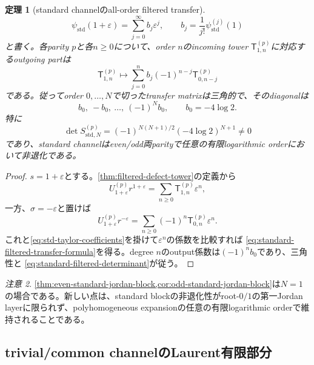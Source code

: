 \documentclass[11pt,a4paper]{ltjsarticle}
\newtheorem{theorem}{定理}[section]
\theoremstyle{definition}
\theoremstyle{remark}
\newtheorem{remark}[theorem]{注意}
\newcommand{\eps}{\varepsilon}
\begin{document}
\begin{theorem}[standard channelのall-order filtered transfer]
\label{thm:standard-filtered-transfer}
\begin{equation}\label{eq:std-taylor-coefficients}
 \psi_{\mathrm{std}}(1+\eps)
 =\sum_{j=0}^{\infty}b_j\eps^j,
 \qquad
 b_j=\frac1{j!}\psi_{\mathrm{std}}^{(j)}(1)
\end{equation}
と書く。各parity $p$と各$n\ge0$について、order $n$のincoming tower
$\mathsf T_{1,n}^{(p)}$に対応するoutgoing partは
\begin{equation}\label{eq:standard-filtered-transfer-formula}
 \boxed{
 \mathsf T_{1,n}^{(p)}\longmapsto
 \sum_{j=0}^{n}
 b_j(-1)^{n-j}\mathsf T_{0,n-j}^{(p)}
 }
\end{equation}
である。従ってorder $0,\ldots,N$で切ったtransfer matrixは三角的で、そのdiagonalは
\begin{equation}\label{eq:standard-filtered-diagonal}
 b_0,\ -b_0,\ \ldots,\ (-1)^Nb_0,
 \qquad b_0=-4\log2.
\end{equation}
特に
\begin{equation}\label{eq:standard-filtered-determinant}
 \boxed{
 \det S_{\mathrm{std},N}^{(p)}
 =(-1)^{N(N+1)/2}(-4\log2)^{N+1}\ne0
 }
\end{equation}
であり、standard channelはeven/odd両parityで任意の有限logarithmic orderにおいて非退化である。
\end{theorem}

\begin{proof}
$s=1+\eps$とする。\cref{thm:filtered-defect-tower}の定義から
\[
 U_{1+\eps}^{(p)}r^{1+\eps}
 =\sum_{n\ge0}\mathsf T_{1,n}^{(p)}\eps^n,
\]
一方、$\sigma=-\eps$と置けば
\[
 U_{1+\eps}^{(p)}r^{-\eps}
 =\sum_{n\ge0}(-1)^n
 \mathsf T_{0,n}^{(p)}\eps^n.
\]
これと\eqref{eq:std-taylor-coefficients}を掛けて$\eps^n$の係数を比較すれば
\eqref{eq:standard-filtered-transfer-formula}を得る。degree $n$のoutput係数は$(-1)^nb_0$であり、三角性と
\eqref{eq:standard-filtered-determinant}が従う。
\end{proof}

\begin{remark}
\cref{thm:even-standard-jordan-block,cor:odd-standard-jordan-block}は$N=1$の場合である。新しい点は、standard blockの非退化性がroot-$0/1$の第一Jordan layerに限られず、polyhomogeneous expansionの任意の有限logarithmic orderで維持されることである。
\end{remark}

\subsection{trivial/common channelのLaurent有限部分}
\end{document}
